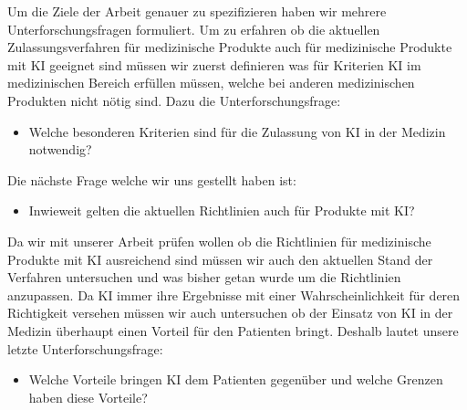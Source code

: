 Um die Ziele der Arbeit genauer zu spezifizieren haben wir mehrere Unterforschungsfragen formuliert. Um zu erfahren ob die aktuellen Zulassungsverfahren für medizinische Produkte auch für medizinische Produkte mit KI geeignet sind müssen wir zuerst definieren was für Kriterien KI im medizinischen Bereich erfüllen müssen, welche bei anderen medizinischen Produkten nicht nötig sind. Dazu die Unterforschungsfrage:
\begin{itemize}
\item Welche besonderen Kriterien sind für die Zulassung von KI in der Medizin notwendig?\end{itemize}
Die nächste Frage welche wir uns gestellt haben ist:\begin{itemize}
\item Inwieweit gelten die aktuellen Richtlinien auch für Produkte mit KI?\end{itemize}
Da wir mit unserer Arbeit prüfen wollen ob die Richtlinien für medizinische Produkte mit KI ausreichend sind müssen wir auch den aktuellen Stand der Verfahren untersuchen und was bisher getan wurde um die Richtlinien anzupassen. Da KI immer ihre Ergebnisse mit einer Wahrscheinlichkeit für deren Richtigkeit versehen müssen wir auch untersuchen ob der Einsatz von KI in der Medizin überhaupt einen Vorteil für den Patienten bringt. Deshalb lautet unsere letzte Unterforschungsfrage:\begin{itemize}\item Welche Vorteile bringen KI dem Patienten gegenüber und welche Grenzen haben diese Vorteile?\end{itemize}